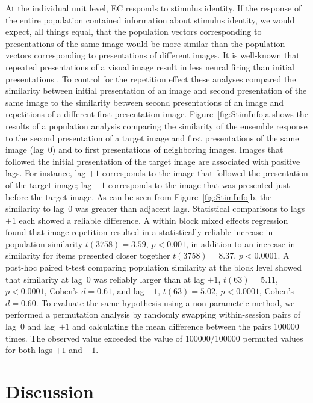 \documentclass{apa}
\begin{document}
At the individual unit level, EC responds to stimulus identity.  
If the response of the entire population contained information about stimulus
identity, we would expect, all things equal, that the population vectors 
corresponding to presentations of the same image would be more similar 
than the population vectors corresponding to presentations of different images.
It is well-known that repeated presentations of a visual image result in less
neural firing than initial presentations \cite{BrowAggl01,MeyeRust18}.  To
control for the repetition effect these analyses compared the similarity
between initial presentation of an image and second presentation of the same
image to the similarity between second presentations of an image and
repetitions of a different first presentation image. 
Figure~\ref{fig:StimInfo}a shows the results of a population analysis 
comparing the similarity of the ensemble response to the second presentation
of a target image and first presentations of the same image (lag~0) and to
first presentations of neighboring images.  Images that followed the initial
presentation of the target image are associated with positive lags.  For
instance, lag $+1$
corresponds to the image that followed the presentation of the target image;
lag $-1$ corresponds to the image that was presented just before the
target image.  As can be seen from Figure~\ref{fig:StimInfo}b, the similarity
to lag~0 was greater than adjacent lags.  
Statistical comparisons to lags $\pm 1$ each showed a reliable difference.
A within block mixed effects regression found that image repetition resulted in a statistically reliable
increase in population similarity $t(3758) = 3.59$, $p<0.001$, in addition to an
increase in similarity for items presented closer together $t(3758)=8.37$, $p<0.0001$. 
A post-hoc paired t-test comparing population similarity at the block level showed that
similarity at lag~0 was reliably larger than at lag $+1$, $t(63)=5.11$, 
$p<0.0001$, Cohen's $d = 0.61$, and lag $-1$, 
 $t(63)=5.02$, $p<0.0001$, Cohen's $d = 0.60$. 
To evaluate the same hypothesis using a non-parametric method, we performed a
permutation analysis by randomly swapping within-session pairs of lag~0 and lag~$\pm 1$
and calculating the mean difference between the pairs 100000 times. 
The
observed value exceeded the value of 100000/100000 permuted values
for both lags $+1$ and $-1$. 


\section*{Discussion}
\end{document}
